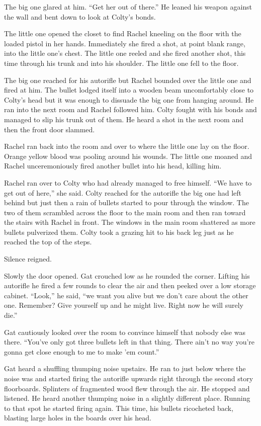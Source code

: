 The big one glared at him. ``Get her out of there.'' He leaned his weapon against the wall and
bent down to look at Colty's bonds.

The little one opened the closet to find Rachel kneeling on the floor with the loaded pistol in
her hands. Immediately she fired a shot, at point blank range, into the little one's chest. The
little one reeled and she fired another shot, this time through his trunk and into his shoulder.
The little one fell to the floor.

The big one reached for his autorifle but Rachel bounded over the little one and fired at him.
The bullet lodged itself into a wooden beam uncomfortably close to Colty's head but it was
enough to dissuade the big one from hanging around. He ran into the next room and Rachel
followed him. Colty fought with his bonds and managed to slip his trunk out of them. He heard a
shot in the next room and then the front door slammed.

Rachel ran back into the room and over to where the little one lay on the floor. Orange yellow
blood was pooling around his wounds. The little one moaned and Rachel unceremoniously fired
another bullet into his head, killing him.

Rachel ran over to Colty who had already managed to free himself. ``We have to get out of
here,'' she said. Colty reached for the autorifle the big one had left behind but just then a
rain of bullets started to pour through the window. The two of them scrambled across the floor
to the main room and then ran toward the stairs with Rachel in front. The windows in the main
room shattered as more bullets pulverized them. Colty took a grazing hit to his back leg just as
he reached the top of the steps.

Silence reigned.

Slowly the door opened. Gat crouched low as he rounded the corner. Lifting his autorifle he
fired a few rounds to clear the air and then peeked over a low storage cabinet. ``Look,'' he
said, ``we want you alive but we don't care about the other one. Remember? Give yourself up and
he might live. Right now he will surely die.''

Gat cautiously looked over the room to convince himself that nobody else was there. ``You've
only got three bullets left in that thing. There ain't no way you're gonna get close enough to
me to make 'em count.''

Gat heard a shuffling thumping noise upstairs. He ran to just below where the noise was and
started firing the autorifle upwards right through the second story floorboards. Splinters of
fragmented wood flew through the air. He stopped and listened. He heard another thumping noise
in a slightly different place. Running to that spot he started firing again. This time, his
bullets ricocheted back, blasting large holes in the boards over his head.

